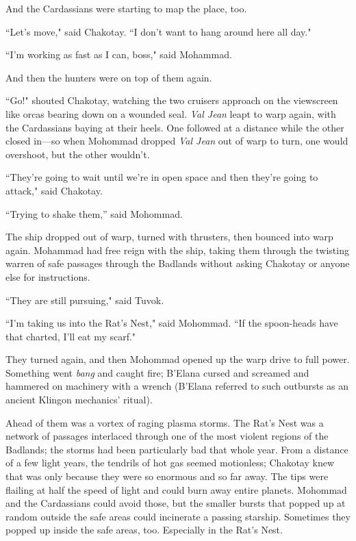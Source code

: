 \documentclass[twoside,letterpaper,12pt]{memoir}
\begin{document}
And the Cardassians were starting to map the place, too.

``Let's move," said Chakotay. ``I don't want to hang around here all day."

``I'm working as fast as I can, boss," said Mohammad.

And then the hunters were on top of them again.

``Go!" shouted Chakotay, watching the two cruisers approach on the viewscreen like orcas bearing down on a wounded seal. \textit{Val Jean} leapt to warp again, with the Cardassians baying at their heels. One followed at a distance while the other closed in---so when Mohommad dropped \textit{Val Jean} out of warp to turn, one would overshoot, but the other wouldn't.

``They're going to wait until we're in open space and then they're going to attack," said Chakotay.

``Trying to shake them,'' said Mohommad.

The ship dropped out of warp, turned with thrusters, then bounced into warp again. Mohammad had free reign with the ship, taking them through the twisting warren of safe passages through the Badlands without asking Chakotay or anyone else for instructions.

``They are still pursuing," said Tuvok.

``I'm taking us into the Rat's Nest," said Mohommad. ``If the spoon-heads have that charted, I'll eat my scarf."

They turned again, and then Mohommad opened up the warp drive to full power. Something went \textit{bang} and caught fire; B'Elana cursed and screamed and hammered on machinery with a wrench (B'Elana referred to such outbursts as an ancient Klingon mechanics' ritual).

Ahead of them was a vortex of raging plasma storms. The Rat's Nest was a network of passages interlaced through one of the most violent regions of the Badlands; the storms had been particularly bad that whole year. From a distance of a few light years, the tendrils of hot gas seemed motionless; Chakotay knew that was only because they were so enormous and so far away. The tips were flailing at half the speed of light and could burn away entire planets. Mohommad and the Cardassians could avoid those, but the smaller bursts that popped up at random outside the safe areas could incinerate a passing starship. Sometimes they popped up inside the safe areas, too. Especially in the Rat's Nest.
\end{document}
